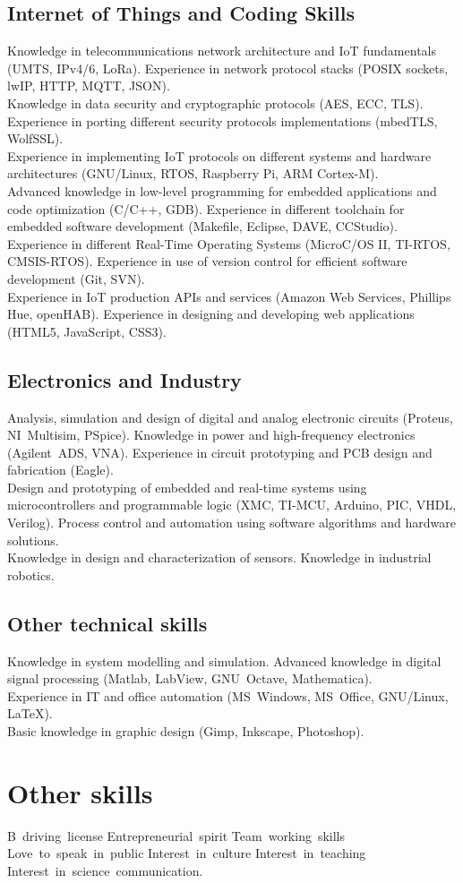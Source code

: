 \documentclass[11pt,a4paper,sans,spanish]{moderncv}
\begin{document}
\subsection{Internet of Things and Coding Skills}
Knowledge in telecommunications network architecture and IoT fundamentals (UMTS, IPv4/6, LoRa). Experience in network protocol stacks (POSIX sockets, lwIP, HTTP, MQTT, JSON).
\protect\\[0.4em]
Knowledge in data security and cryptographic protocols (AES, ECC, TLS). Experience in porting different security protocols implementations (mbedTLS, WolfSSL).
\protect\\[0.4em]
Experience in implementing IoT protocols on different systems and hardware architectures (GNU/Linux, RTOS, Raspberry Pi, ARM Cortex-M).
\protect\\[0.4em]
Advanced knowledge in low-level programming for embedded applications and code optimization (C/C++, GDB). Experience in different toolchain for embedded software development (Makefile, Eclipse, DAVE, CCStudio). Experience in different Real-Time Operating Systems (MicroC/OS II, TI-RTOS, CMSIS-RTOS). Experience in use of version control for efficient software development (Git, SVN).
\protect\\[0.4em]
Experience in IoT production APIs and services (Amazon Web Services, Phillips Hue, openHAB). Experience in designing and developing web applications (HTML5, JavaScript, CSS3).


\subsection{Electronics and Industry}
Analysis, simulation and design of digital and analog electronic circuits (Proteus, NI~Multisim, PSpice). Knowledge in power and high-frequency electronics (Agilent~ADS, VNA). Experience in circuit prototyping and PCB design and fabrication (Eagle).
\protect\\[0.4em]
Design and prototyping of embedded and real-time systems using microcontrollers and programmable logic (XMC, TI-MCU, Arduino, PIC, VHDL, Verilog).
Process control and automation using software algorithms and hardware solutions.
\protect\\[0.4em]
Knowledge in design and characterization of sensors. Knowledge in industrial robotics.


\subsection{Other technical skills}
Knowledge in system modelling and simulation. Advanced knowledge in digital signal processing (Matlab, LabView, GNU~Octave, Mathematica).
\protect\\[0.4em]
Experience in IT and office automation (MS~Windows, MS~Office, GNU/Linux, LaTeX).
\protect\\[0.4em]
Basic knowledge in graphic design (Gimp, Inkscape, Photoshop).


\section{Other skills}
\begin{center}
B~driving~license \quad{} Entrepreneurial~spirit \quad{} Team~working~skills \quad{} Love~to~speak~in~public \quad{} Interest~in~culture \quad{} Interest~in~teaching \quad{} Interest~in~science~communication.
\end{center}
\end{document}
